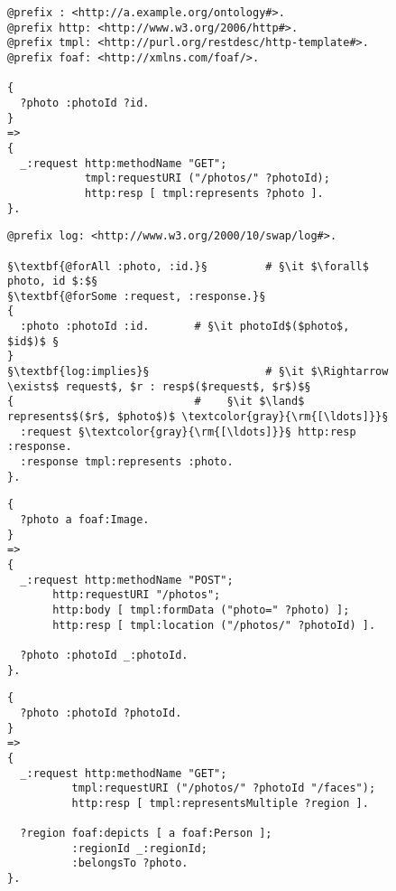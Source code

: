 \documentclass[runningheads,a4paper, twocolumn]{llncs}
\begin{document}
\begin{figure}[float=t!]
\vspace{.5em}
\begin{lstlisting}[caption=RESTdesc description of photo retrieval,
                   label=lst:PhotoGet, escapechar=§]
@prefix : <http://a.example.org/ontology#>.
@prefix http: <http://www.w3.org/2006/http#>.
@prefix tmpl: <http://purl.org/restdesc/http-template#>.
@prefix foaf: <http://xmlns.com/foaf/>.

{
  ?photo :photoId ?id.
}
=>
{
  _:request http:methodName "GET";
            tmpl:requestURI ("/photos/" ?photoId);
            http:resp [ tmpl:represents ?photo ].
}.
\end{lstlisting}

\begin{lstlisting}[caption=\autoref{lst:PhotoGet} with explicit quantifiers,
                   label=lst:PhotoGetQuantifiers, escapechar=§]
@prefix log: <http://www.w3.org/2000/10/swap/log#>.

§\textbf{@forAll :photo, :id.}§         # §\it $\forall$ photo, id $:$§
§\textbf{@forSome :request, :response.}§
{
  :photo :photoId :id.       # §\it photoId$($photo$, $id$)$ §
}
§\textbf{log:implies}§                  # §\it $\Rightarrow \exists$ request$, $r : resp$($request$, $r$)$§
{                            #    §\it $\land$ represents$($r$, $photo$)$ \textcolor{gray}{\rm{[\ldots]}}§
  :request §\textcolor{gray}{\rm{[\ldots]}}§ http:resp :response.
  :response tmpl:represents :photo.
}.
\end{lstlisting}

\begin{lstlisting}[caption=RESTdesc description of photo upload,
                   label=lst:PhotoUpload, escapechar=§]
{
  ?photo a foaf:Image.
}
=>
{
  _:request http:methodName "POST";
       http:requestURI "/photos";
       http:body [ tmpl:formData ("photo=" ?photo) ];
       http:resp [ tmpl:location ("/photos/" ?photoId) ].

  ?photo :photoId _:photoId.
}.
\end{lstlisting}

\begin{lstlisting}[caption=RESTdesc description of face detection,
                   label=lst:FaceDetection, escapechar=§]
{
  ?photo :photoId ?photoId.
}
=>
{
  _:request http:methodName "GET";
          tmpl:requestURI ("/photos/" ?photoId "/faces");
          http:resp [ tmpl:representsMultiple ?region ].
  
  ?region foaf:depicts [ a foaf:Person ];
          :regionId _:regionId;
          :belongsTo ?photo.
}.
\end{lstlisting}


\end{figure}
\end{document}
